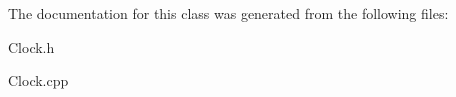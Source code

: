 The documentation for this class was generated from the following files\-:\begin{DoxyCompactItemize}
\item 
Clock.\-h\item 
Clock.\-cpp\end{DoxyCompactItemize}
